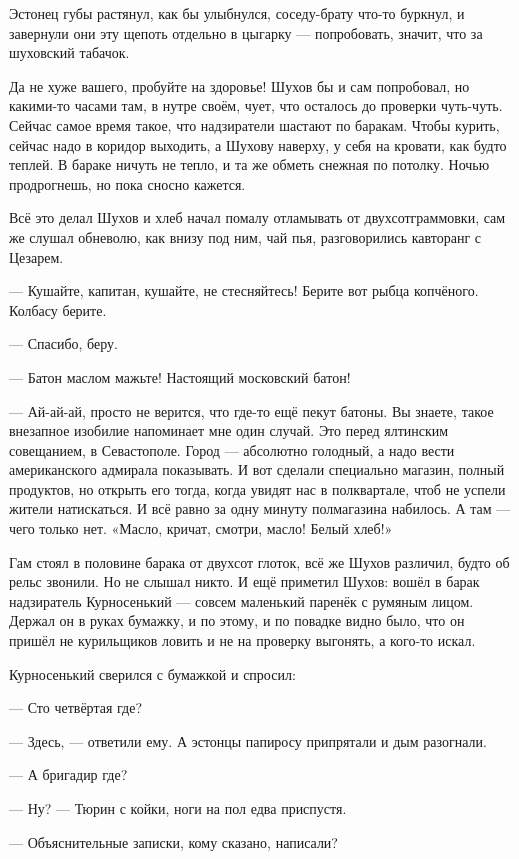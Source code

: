 Эстонец губы растянул, как бы улыбнулся, соседу-брату что-то буркнул, и завернули они эту 
щепоть отдельно в цыгарку --- попробовать, значит, что за шуховский табачок.

Да не хуже вашего, пробуйте на здоровье! Шухов бы и сам попробовал, но какими-то часами там, в 
нутре своём, чует, что осталось до проверки чуть-чуть. Сейчас самое время такое, что 
надзиратели шастают по баракам. Чтобы курить, сейчас надо в коридор выходить, а Шухову 
наверху, у себя на кровати, как будто теплей. В бараке ничуть не тепло, и та же обметь снежная 
по потолку. Ночью продрогнешь, но пока сносно кажется.

Всё это делал Шухов и хлеб начал помалу отламывать от двухсотграммовки, сам же слушал 
обневолю, как внизу под ним, чай пья, разговорились кавторанг с Цезарем.

--- Кушайте, капитан, кушайте, не стесняйтесь! Берите вот рыбца копчёного. Колбасу берите.

--- Спасибо, беру.

--- Батон маслом мажьте! Настоящий московский батон!

--- Ай-ай-ай, просто не верится, что где-то ещё пекут батоны. Вы знаете, такое внезапное 
изобилие напоминает мне один случай. Это перед ялтинским совещанием, в Севастополе. Город --- 
абсолютно голодный, а надо вести американского адмирала показывать. И вот сделали 
специально магазин, полный продуктов, но открыть его тогда, когда увидят нас в полквартале, 
чтоб не успели жители натискаться. И всё равно за одну минуту полмагазина набилось. А там --- 
чего только нет. «Масло, кричат, смотри, масло! Белый хлеб!»

Гам стоял в половине барака от двухсот глоток, всё же Шухов различил, будто об рельс звонили. 
Но не слышал никто. И ещё приметил Шухов: вошёл в барак надзиратель Курносенький --- совсем 
маленький паренёк с румяным лицом. Держал он в руках бумажку, и по этому, и по повадке видно 
было, что он пришёл не курильщиков ловить и не на проверку выгонять, а кого-то искал.

Курносенький сверился с бумажкой и спросил:

--- Сто четвёртая где?

--- Здесь, --- ответили ему. А эстонцы папиросу припрятали и дым разогнали.

--- А бригадир где?

--- Ну? --- Тюрин с койки, ноги на пол едва приспустя.

--- Объяснительные записки, кому сказано, написали?

